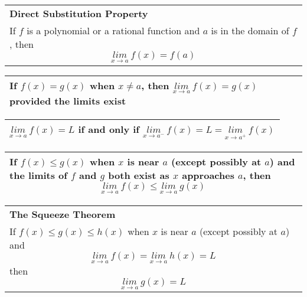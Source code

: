 \documentclass[fleqn]{article}
\begin{document}
\begin{center}
\def\arraystretch{1.3}
{\setlength{\tabcolsep}{16pt}
\begin{tabularx}{.9\textwidth}{|X|}
\hline
	\vspace{1pt}
	\textbf{Direct Substitution Property} \\
	If $f$ is a polynomial or a rational function and $a$ is in the domain of $f$, then
	$$\underset{x \to a}{lim} \: f(x) = f(a)$$ \\
\hline
\end{tabularx}}
\vspace{12pt}

\def\arraystretch{1.3}
{\setlength{\tabcolsep}{16pt}
\begin{tabularx}{.9\textwidth}{|X|}
\hline
	\vspace{1pt}
	If $f(x) = g(x)$ when $x \ne a$, then \hspace{12pt} $\underset{x \to a}{lim} \: f(x) = g(x)$ \hspace{12pt} provided the limits exist \\[16pt]
\hline
\end{tabularx}}
\vspace{12pt}

\def\arraystretch{1.3}
{\setlength{\tabcolsep}{16pt}
\begin{tabularx}{.9\textwidth}{|X|}
\hline
	\vspace{1pt}
	$\underset{x \to a}{lim} \: f(x) = L$ \hspace{12pt} if and only if \hspace{12pt} $\underset{x \to a^-}{lim} \: f(x) = L = \underset{x \to a^+}{lim} \: f(x)$ \\[16pt]
\hline
\end{tabularx}}
\vspace{12pt}

\def\arraystretch{1.3}
{\setlength{\tabcolsep}{16pt}
\begin{tabularx}{.9\textwidth}{|X|}
\hline
	\vspace{1pt}
	If $f(x) \le g(x)$ when $x$ is near $a$ (except possibly at $a$) and the limits of $f$ and $g$ both exist as $x$ approaches $a$, then
	$$\underset{x \to a}{lim} \: f(x) \le \underset{x \to a}{lim} \: g(x)$$ \\
\hline
\end{tabularx}}
\vspace{12pt}

\def\arraystretch{1.3}
{\setlength{\tabcolsep}{16pt}
\begin{tabularx}{.9\textwidth}{|X|}
\hline
	\vspace{1pt}
	\textbf{The Squeeze Theorem} \\
	If $f(x) \le g(x) \le h(x)$ when $x$ is near $a$ (except possibly at $a$) and
	$$\underset{x \to a}{lim} \: f(x) = \underset{x \to a}{lim} \: h(x) = L$$
	then
	$$\underset{x \to a}{lim} \: g(x) = L$$ \\
\hline
\end{tabularx}}
\vspace{32pt}
\pagebreak


\end{center}
\end{document}
